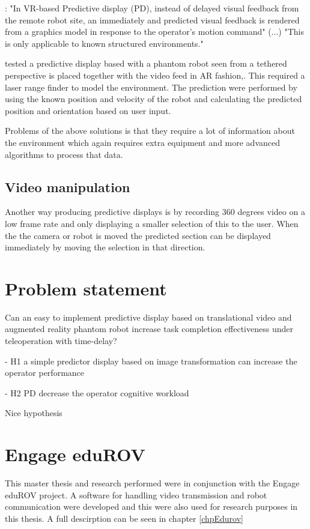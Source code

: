 \citep{Hu2016}: "In VR-based Predictive display (PD), instead of delayed visual feedback from the remote robot site, an immediately and predicted visual feedback is rendered from a graphics model in response to the operator's motion command" (...) "This is only applicable to known structured environments."

\citep{Ricks2004} tested a predictive display based with a phantom robot seen from a tethered perspective is placed together with the video feed in AR fashion,. This required a laser range finder to model the environment. The prediction were performed by using the known position and velocity of the robot and calculating the predicted position and orientation based on user input.

Problems of the above solutions is that they require a lot of information about the environment which again requires extra equipment and more advanced algorithms to process that data.


\subsection{Video manipulation}

Another way producing predictive displays is by recording 360 degrees video on a low frame rate and only displaying a smaller selection of this to the user. When the the camera or robot is moved the predicted section can be displayed immediately by moving the selection in that direction. \citep{Baldwin1999}


\section{Problem statement}

Can an easy to implement predictive display based on translational video and augmented reality phantom robot increase task completion effectiveness under teleoperation with time-delay?

- H1 a simple predictor display based on image transformation can 
 increase the operator performance
 
- H2 PD decrease the operator cognitive workload
 
\citep{Lu2018} Nice hypothesis

\section{Engage eduROV}

This master thesis and research performed were in conjunction with the Engage eduROV project. A software for handling video transmission and robot communication were developed and this were also used for research purposes in this thesis. A full descirption can be seen in chapter \ref{chpEdurov}

